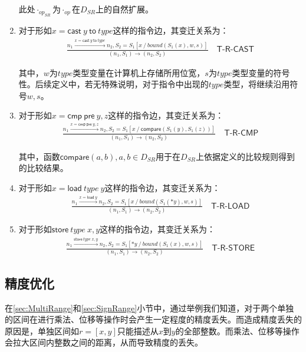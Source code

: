 \begin{enumerate}
此处$ \cdot_{op_{SR}} $为$ \cdot_{op} $在$ D_{SR} $上的自然扩展。

\item 对于形如$ x = \mathsf{cast}  ~y ~\mathsf{to} ~type$这样的指令边，其变迁关系为：
\begin{align}
\frac{n_1 \xrightarrow{x = \mathsf{cast}  ~y ~\mathsf{to} ~type} n_2, 
	S_2 = S_1[x ~/~ bound(S_1(x), w, s) ]}
{(n_1, S_1) \to (n_2, S_2)}
\quad\textsf{T-R-CAST}
\end{align}

其中，$ w $为$ type $类型变量在计算机上存储所用位宽，$ s $为$ type $类型变量的符号性。后续定义中，若无特殊说明，对于指令中出现的$ type $类型，将继续沿用符号$ w, s $。

\item 对于形如$ x = \mathsf{cmp~pre}  ~y, z$这样的指令边，其变迁关系为：
\begin{align}
\frac{n_1 \xrightarrow{x = \mathsf{cmp~pre}  ~y, z} n_2, 
	S_2 = S_1[x ~/~ \mathsf{compare}(S_1(y), S_1(z)) ]}
{(n_1, S_1) \to (n_2, S_2)}
\quad\textsf{T-R-CMP}
\end{align}

其中，函数$ \mathsf{compare}(a, b), a, b\in D_{SR} $用于在$ D_{SR} $上依据定义的比较规则得到的比较结果。

\item 对于形如$ x = \mathsf{load} ~type ~y $这样的指令边，其变迁关系为：
\begin{align}
\frac{n_1 \xrightarrow{x = \mathsf{load}  ~y } n_2, 
	S_2 = S_1[x ~/~ bound(S_1(*y), w, s)]}
{(n_1, S_1) \to (n_2, S_2)}
\quad\textsf{T-R-LOAD}
\end{align}

\item 对于形如$ \mathsf{store}  ~type ~x, y $这样的指令边，其变迁关系为：
\begin{align}
\frac{n_1 \xrightarrow{\mathsf{store}  ~type ~x, y} n_2, 
	S_2 = S_1[*y ~/~ bound(S_1(x), w, s)]}
{(n_1, S_1) \to (n_2, S_2)}
\quad\textsf{T-R-STORE}
\end{align}

\end{enumerate}

\subsection{精度优化}

在\ref{sec:MultiRange}和\ref{sec:SignRange}小节中，通过举例我们知道，对于两个单独的区间在进行乘法、位移等操作时会产生一定程度的精度丢失。而造成精度丢失的原因是，单独区间如$ r = [x, y] $只能描述从$ x $到$ y $的全部整数。而乘法、位移等操作会拉大区间内整数之间的距离，从而导致精度的丢失。

